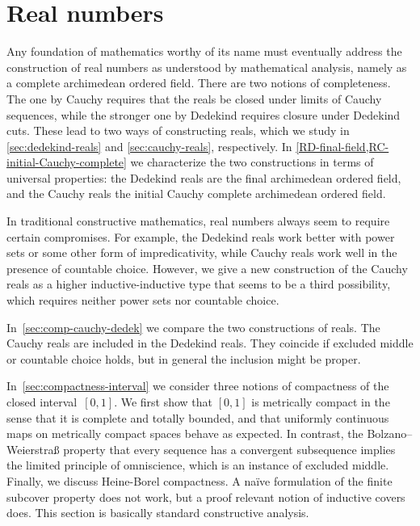 \chapter{Real numbers}
\label{cha:real-numbers}

%
Any foundation of mathematics worthy of its name must eventually address the construction of real numbers as understood by mathematical analysis, namely as a complete archimedean ordered field.
%
There are two notions of completeness. The one by Cauchy requires that the reals be closed under limits of Cauchy sequences, while the stronger one by Dedekind requires closure under Dedekind cuts.
These lead to two ways of constructing reals, which we study in \autoref{sec:dedekind-reals} and \autoref{sec:cauchy-reals}, respectively. In \autoref{RD-final-field,RC-initial-Cauchy-complete} we characterize the two constructions in terms of universal properties: the Dedekind reals are the final archimedean ordered field, and the Cauchy reals the initial Cauchy complete archimedean ordered field.

In traditional constructive mathematics,
%
real numbers always seem to require certain compromises. For example, the Dedekind reals work better with power sets or some other form of impredicativity, while Cauchy reals work well in the presence of countable choice.
%
However, we give a new construction of the Cauchy reals as a higher inductive-inductive type that seems to be a third possibility, which requires neither power sets nor countable choice.

In~\autoref{sec:comp-cauchy-dedek} we compare the two constructions of reals. The Cauchy reals are included in the Dedekind reals. They coincide if excluded middle or countable choice holds, but in general the inclusion might be proper.

In~\autoref{sec:compactness-interval} we consider three notions of compactness of the closed interval~$[0,1]$. We first show that $[0,1]$ is metrically compact in the sense that it is complete and totally bounded, and that uniformly continuous maps on metrically compact spaces behave as expected. In contrast, the Bolzano--Weierstra\ss{} property that every sequence has a convergent subsequence implies the limited principle of omniscience, which is an instance of excluded middle. Finally, we discuss Heine-Borel compactness. A na\"ive formulation of the finite subcover property does not work, but a proof relevant notion of inductive covers does.
This section is basically standard constructive analysis.

